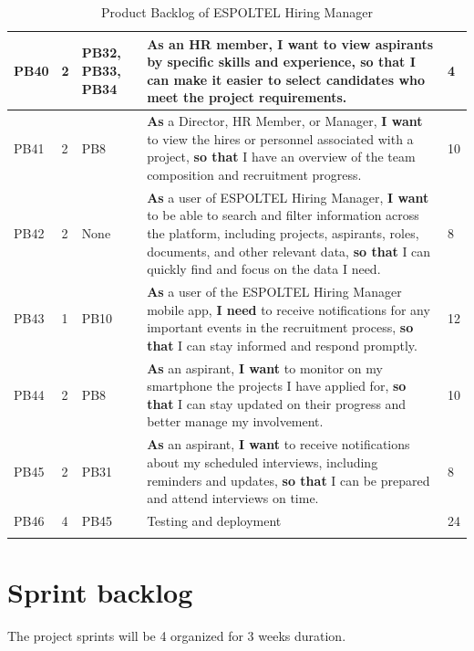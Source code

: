 \documentclass{scrreprt}
\newcounter{sprint}
\begin{document}
\begin{longtable}{|p{0.8cm}|p{1.5cm}|p{2.5cm}|p{8cm}|p{2cm}|}
	PB40 & 2 & PB32, PB33, PB34  & \textbf{As} an HR member, \textbf{I want} to view aspirants by specific skills and experience, \textbf{so that} I can make it easier to select candidates who meet the project requirements. & 4 \\ \hline
	PB41 & 2 & PB8 & \textbf{As} a Director, HR Member, or Manager, \textbf{I want} to view the hires or personnel associated with a project, \textbf{so that} I have an overview of the team composition and recruitment progress. & 10 \\ \hline
	PB42 & 2 & None & \textbf{As} a user of ESPOLTEL Hiring Manager, \textbf{I want} to be able to search and filter information across the platform, including projects, aspirants, roles, documents, and other relevant data, \textbf{so that} I can quickly find and focus on the data I need. & 8 \\ \hline
	
	PB43 & 1 & PB10 & \textbf{As} a user of the ESPOLTEL Hiring Manager mobile app, \textbf{I need} to receive notifications for any important events in the recruitment process, \textbf{so that} I can stay informed and respond promptly. & 12 \\ \hline
	PB44 & 2 & PB8 & \textbf{As} an aspirant, \textbf{I want} to monitor on my smartphone the projects I have applied for, \textbf{so that} I can stay updated on their progress and better manage my involvement. & 10 \\ \hline
	PB45 & 2 & PB31 & \textbf{As} an aspirant, \textbf{I want} to receive notifications about my scheduled interviews, including reminders and updates, \textbf{so that} I can be prepared and attend interviews on time. & 8 \\ \hline
	
	PB46 & 4 & PB45 & Testing and deployment& 24\\ \hline
	\caption{Product Backlog of ESPOLTEL Hiring Manager}
\end{longtable}

\section{Sprint backlog}
The project sprints will be 4 organized for 3 weeks duration.
\end{document}
